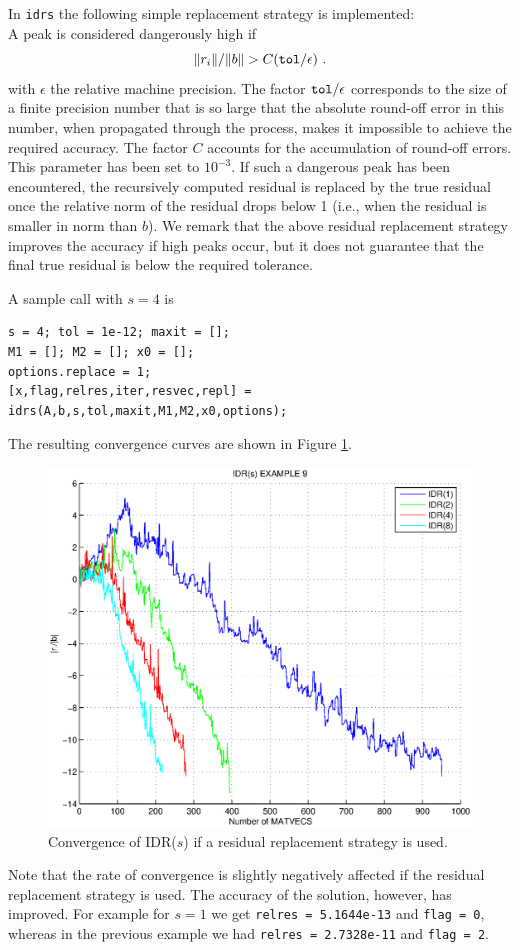 \documentclass[prodmode,acmtoms]{acmsmall}
\begin{document}
In {\tt idrs} the following simple replacement strategy is implemented: \\
A peak is considered dangerously high if 
\[  
   \| r_i \| / \|b\| > C( {\tt tol}/ \epsilon ) ~.
\]
with $\epsilon$ the relative machine precision. The factor ${\tt tol}/ \epsilon$ corresponds to the size of a 
finite precision number that is so large that the absolute round-off error in this number,
when propagated through the process, makes it impossible to achieve the required accuracy.
The factor $C$ accounts for the accumulation of round-off errors.  This parameter has been set to $10^{-3}$.
If such a dangerous peak has been encountered, the recursively computed residual is replaced by the true residual 
once the relative norm of the residual drops below 1 (i.e., when the residual is smaller in norm than $b$).
We remark that the above residual replacement strategy improves the accuracy if high peaks occur, but it does not guarantee that the final true 
residual is below the required tolerance.

A sample call with $s=4$ is 
\begin{verbatim}
s = 4; tol = 1e-12; maxit = [];
M1 = []; M2 = []; x0 = [];
options.replace = 1;
[x,flag,relres,iter,resvec,repl] = idrs(A,b,s,tol,maxit,M1,M2,x0,options);
\end{verbatim}
 
The resulting convergence curves are shown in Figure \ref{fig:example9}.
\begin{figure}
\centering
\includegraphics[width=.60\linewidth]{example9}
\caption{Convergence of IDR($s$) if a residual replacement strategy is used.}
\label{fig:example9}
\end{figure}
Note that the rate of convergence is slightly negatively affected if the residual replacement strategy is used. The accuracy of the solution,
however, has improved. For example for $s=1$ we get {\tt relres = 5.1644e-13} and {\tt flag = 0}, whereas in the previous example we had 
{\tt relres = 2.7328e-11} and {\tt flag = 2}. 
\end{document}
